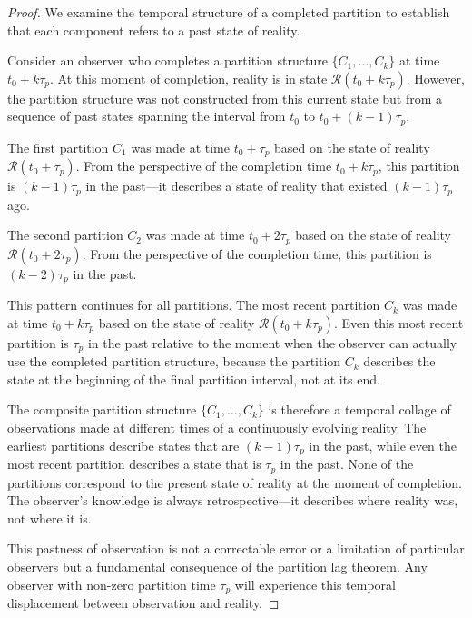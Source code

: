 \documentclass[12pt,a4paper]{article}
\theoremstyle{definition}
\theoremstyle{remark}
\begin{document}
\begin{proof}
We examine the temporal structure of a completed partition to establish that each component refers to a past state of reality.

Consider an observer who completes a partition structure $\{C_1, \ldots, C_k\}$ at time $t_0 + k\tau_p$. At this moment of completion, reality is in state $\mathcal{R}(t_0 + k\tau_p)$. However, the partition structure was not constructed from this current state but from a sequence of past states spanning the interval from $t_0$ to $t_0 + (k-1)\tau_p$.

The first partition $C_1$ was made at time $t_0 + \tau_p$ based on the state of reality $\mathcal{R}(t_0 + \tau_p)$. From the perspective of the completion time $t_0 + k\tau_p$, this partition is $(k-1)\tau_p$ in the past—it describes a state of reality that existed $(k-1)\tau_p$ ago.

The second partition $C_2$ was made at time $t_0 + 2\tau_p$ based on the state of reality $\mathcal{R}(t_0 + 2\tau_p)$. From the perspective of the completion time, this partition is $(k-2)\tau_p$ in the past.

This pattern continues for all partitions. The most recent partition $C_k$ was made at time $t_0 + k\tau_p$ based on the state of reality $\mathcal{R}(t_0 + k\tau_p)$. Even this most recent partition is $\tau_p$ in the past relative to the moment when the observer can actually use the completed partition structure, because the partition $C_k$ describes the state at the beginning of the final partition interval, not at its end.

The composite partition structure $\{C_1, \ldots, C_k\}$ is therefore a temporal collage of observations made at different times of a continuously evolving reality. The earliest partitions describe states that are $(k-1)\tau_p$ in the past, while even the most recent partition describes a state that is $\tau_p$ in the past. None of the partitions correspond to the present state of reality at the moment of completion. The observer's knowledge is always retrospective—it describes where reality was, not where it is.

This pastness of observation is not a correctable error or a limitation of particular observers but a fundamental consequence of the partition lag theorem. Any observer with non-zero partition time $\tau_p$ will experience this temporal displacement between observation and reality.
\end{proof}
\end{document}
